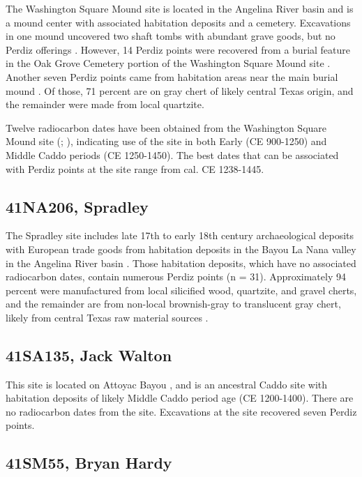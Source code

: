 \documentclass[review]{elsarticle}
\begin{document}
The Washington Square Mound site is located in the Angelina River basin and is a mound center with associated habitation deposits and a cemetery. Excavations in one mound uncovered two shaft tombs with abundant grave goods, but no Perdiz offerings \citep{RN914,RN12}. However, 14 Perdiz points were recovered from a burial feature in the Oak Grove Cemetery portion of the Washington Square Mound site \citep[Figure 77]{RN12}. Another seven Perdiz points came from habitation areas near the main burial mound \citep[Table 14]{RN8963}. Of those, 71 percent are on gray chert of likely central Texas origin, and the remainder were made from local quartzite.

Twelve radiocarbon dates have been obtained from the Washington Square Mound site (\citealp[Table 4]{RN914}; \citealp{RN2944}), indicating use of the site in both Early (CE 900-1250) and Middle Caddo periods (CE 1250-1450). The best dates that can be associated with Perdiz points at the site range from cal. CE 1238-1445.

\subsection*{41NA206, Spradley}

The Spradley site includes late 17th to early 18th century archaeological deposits with European trade goods from habitation deposits in the Bayou La Nana valley in the Angelina River basin \citep{RN8965}. Those habitation deposits, which have no associated radiocarbon dates, contain numerous Perdiz points (n = 31). Approximately 94 percent were manufactured from local silicified wood, quartzite, and gravel cherts, and the remainder are from non-local brownish-gray to translucent gray chert, likely from central Texas raw material sources \citep[Table 7]{RN8965}.

\subsection*{41SA135, Jack Walton}

This site is located on Attoyac Bayou \citep{RN1971}, and is an ancestral Caddo site with habitation deposits of likely Middle Caddo period age (CE 1200-1400). There are no radiocarbon dates from the site. Excavations at the site recovered seven Perdiz points.

\subsection*{41SM55, Bryan Hardy}
\end{document}
